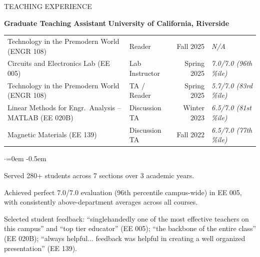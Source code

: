 \documentclass{resume} %
\begin{document}
\begin{rSection}{TEACHING EXPERIENCE}

{\bf Graduate Teaching Assistant} \hfill {\bf University of California, Riverside}

\vspace{0.3em}
\begin{tabular}{ @{} p{8.5cm} l r l }
Technology in the Premodern World (ENGR 108) & Reader & Fall 2025 & \textit{N/A} \\
Circuits and Electronics Lab (EE 005) & Lab Instructor & Spring 2025 & \textit{7.0/7.0 (96th \%ile)} \\
Technology in the Premodern World (ENGR 108) & TA / Reader & Spring 2025 & \textit{5.7/7.0 (83rd \%ile)} \\
Linear Methods for Engr.\ Analysis -- MATLAB (EE 020B) & Discussion TA & Winter 2023 & \textit{6.5/7.0 (81st \%ile)} \\
Magnetic Materials (EE 139) & Discussion TA & Fall 2022 & \textit{6.5/7.0 (77th \%ile)} \\
\end{tabular}
\vspace{0.3em}

\begin{list}{$\cdot$}{\leftmargin=0em}
\itemsep -0.5em \vspace{-0.5em}
\item Served 280+ students across 7 sections over 3 academic years.
\item Achieved perfect 7.0/7.0 evaluation (96th percentile campus-wide) in EE 005, with consistently above-department averages across all courses.
\item Selected student feedback: ``singlehandedly one of the most effective teachers on this campus'' and ``top tier educator'' (EE 005); ``the backbone of the entire class'' (EE 020B); ``always helpful... feedback was helpful in creating a well organized presentation'' (EE 139).
\end{list}
\vspace{0.5em}

\end{rSection}

\end{document}

